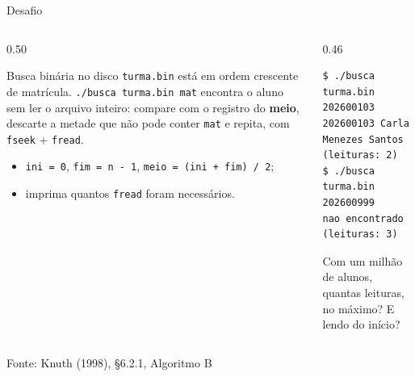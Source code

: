 \documentclass[aspectratio=169]{beamer}
\newcommand{\fonte}[1]{\vfill\hfill{\scriptsize\textcolor{UFSGray}{Fonte: #1}}}
\begin{document}
\begin{frame}[fragile]{Desafio}
  \vspace{-0.4em}
  \begin{columns}[T]
    \begin{column}{0.50\textwidth}
      \begin{block}{Busca binária no disco}
        \small \texttt{turma.bin} está em ordem crescente de matrícula.
        \texttt{./busca turma.bin mat} encontra o aluno sem ler o arquivo
        inteiro: compare com o registro do \textbf{meio}, descarte a metade
        que não pode conter \texttt{mat} e repita, com \texttt{fseek} +
        \texttt{fread}.
        \vspace{-0.3em}
        \begin{itemize}
          \item \texttt{ini = 0}, \texttt{fim = n - 1}, \texttt{meio = (ini
            + fim) / 2};
          \item imprima quantos \texttt{fread} foram necessários.
        \end{itemize}
      \end{block}
    \end{column}
    \begin{column}{0.46\textwidth}
\begin{lstlisting}[style=shellS, language={}]
$ ./busca turma.bin 202600103
202600103 Carla Menezes Santos (leituras: 2)
$ ./busca turma.bin 202600999
nao encontrado (leituras: 3)
\end{lstlisting}
      \raggedright\small Com um milhão de alunos, quantas leituras, no
      máximo? E lendo do início?
    \end{column}
  \end{columns}
  \fonte{Knuth (1998), §6.2.1, Algoritmo B~\cite{knuth1998art}}
\end{frame}
\end{document}
